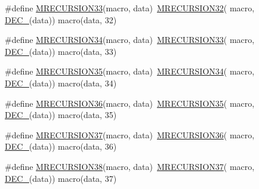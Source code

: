 \begin{DoxyCompactItemize}
\item 
\#define \mbox{\hyperlink{group__group__sam0__utils__mrecursion_ga69b9fe1f38b856bfbce8006cecfb7ab6}{M\+R\+E\+C\+U\+R\+S\+I\+O\+N33}}(macro,  data)~\mbox{\hyperlink{group__group__sam0__utils__mrecursion_gac43f3446adca956aebe694bac78623eb}{M\+R\+E\+C\+U\+R\+S\+I\+O\+N32}}(  macro, \mbox{\hyperlink{group__group__sam0__utils__mrecursion_ga1d23d683797679dca8c3512a54a5dcae}{D\+E\+C\+\_\+}}(data))   macro(data, 32)
\item 
\#define \mbox{\hyperlink{group__group__sam0__utils__mrecursion_ga36973b26fc7f9e90f40c6667a2f2c85c}{M\+R\+E\+C\+U\+R\+S\+I\+O\+N34}}(macro,  data)~\mbox{\hyperlink{group__group__sam0__utils__mrecursion_ga69b9fe1f38b856bfbce8006cecfb7ab6}{M\+R\+E\+C\+U\+R\+S\+I\+O\+N33}}(  macro, \mbox{\hyperlink{group__group__sam0__utils__mrecursion_ga1d23d683797679dca8c3512a54a5dcae}{D\+E\+C\+\_\+}}(data))   macro(data, 33)
\item 
\#define \mbox{\hyperlink{group__group__sam0__utils__mrecursion_gabb6594c5157f3ae6651cce3ec53ec922}{M\+R\+E\+C\+U\+R\+S\+I\+O\+N35}}(macro,  data)~\mbox{\hyperlink{group__group__sam0__utils__mrecursion_ga36973b26fc7f9e90f40c6667a2f2c85c}{M\+R\+E\+C\+U\+R\+S\+I\+O\+N34}}(  macro, \mbox{\hyperlink{group__group__sam0__utils__mrecursion_ga1d23d683797679dca8c3512a54a5dcae}{D\+E\+C\+\_\+}}(data))   macro(data, 34)
\item 
\#define \mbox{\hyperlink{group__group__sam0__utils__mrecursion_gaedf0d84c05535e2176c874e6e33ee175}{M\+R\+E\+C\+U\+R\+S\+I\+O\+N36}}(macro,  data)~\mbox{\hyperlink{group__group__sam0__utils__mrecursion_gabb6594c5157f3ae6651cce3ec53ec922}{M\+R\+E\+C\+U\+R\+S\+I\+O\+N35}}(  macro, \mbox{\hyperlink{group__group__sam0__utils__mrecursion_ga1d23d683797679dca8c3512a54a5dcae}{D\+E\+C\+\_\+}}(data))   macro(data, 35)
\item 
\#define \mbox{\hyperlink{group__group__sam0__utils__mrecursion_gaae1f3283975fe24b9f70597329a3e87f}{M\+R\+E\+C\+U\+R\+S\+I\+O\+N37}}(macro,  data)~\mbox{\hyperlink{group__group__sam0__utils__mrecursion_gaedf0d84c05535e2176c874e6e33ee175}{M\+R\+E\+C\+U\+R\+S\+I\+O\+N36}}(  macro, \mbox{\hyperlink{group__group__sam0__utils__mrecursion_ga1d23d683797679dca8c3512a54a5dcae}{D\+E\+C\+\_\+}}(data))   macro(data, 36)
\item 
\#define \mbox{\hyperlink{group__group__sam0__utils__mrecursion_ga88be78dfd27dc8ef724cd937c81715ef}{M\+R\+E\+C\+U\+R\+S\+I\+O\+N38}}(macro,  data)~\mbox{\hyperlink{group__group__sam0__utils__mrecursion_gaae1f3283975fe24b9f70597329a3e87f}{M\+R\+E\+C\+U\+R\+S\+I\+O\+N37}}(  macro, \mbox{\hyperlink{group__group__sam0__utils__mrecursion_ga1d23d683797679dca8c3512a54a5dcae}{D\+E\+C\+\_\+}}(data))   macro(data, 37)

\end{DoxyCompactItemize}
